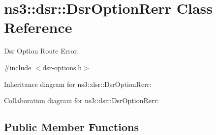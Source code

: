 \hypertarget{classns3_1_1dsr_1_1DsrOptionRerr}{}\section{ns3\+:\+:dsr\+:\+:Dsr\+Option\+Rerr Class Reference}
\label{classns3_1_1dsr_1_1DsrOptionRerr}


Dsr Option Route Error.  




{\ttfamily \#include $<$dsr-\/options.\+h$>$}



Inheritance diagram for ns3\+:\+:dsr\+:\+:Dsr\+Option\+Rerr\+:


Collaboration diagram for ns3\+:\+:dsr\+:\+:Dsr\+Option\+Rerr\+:
\subsection*{Public Member Functions}
